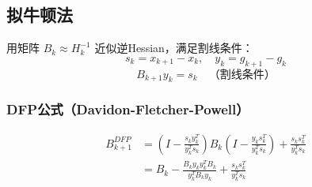 \subsection{拟牛顿法}\label{sec:quasi-newton}

\begin{conceptbox}[拟牛顿法]
用矩阵 $B_k \approx H_k^{-1}$ 近似逆Hessian，满足割线条件：
\[
s_k = x_{k+1} - x_k, \quad y_k = g_{k+1} - g_k
\]
\[
B_{k+1} y_k = s_k \quad \text{（割线条件）}
\]
\end{conceptbox}

\subsubsection{DFP公式（Davidon-Fletcher-Powell）}

\begin{align}
B_{k+1}^{DFP} &= \left(I - \frac{s_k y_k^T}{y_k^T s_k}\right) B_k \left(I - \frac{y_k s_k^T}{y_k^T s_k}\right) + \frac{s_k s_k^T}{y_k^T s_k} \\
&= B_k - \frac{B_k y_k y_k^T B_k}{y_k^T B_k y_k} + \frac{s_k s_k^T}{y_k^T s_k}
\end{align}

